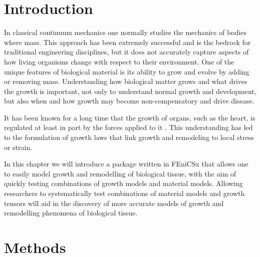 \section{Introduction}
In classical continuum mechanics one normally studies the mechanics of bodies where mass. This approach has been extremely successful and is the bedrock for traditional engineering disciplines, but it does not accurately capture aspects of how living organisms change with respect to their environment. One of the unique features of biological material is its ability to grow and evolve by adding or removing mass. Understanding how biological matter grows and what drives the growth is important, not only to understand normal growth and development, but also when and how growth may become non-compensatory and drive disease.\par It has been known for a long time that the growth of organs, such as the heart, is regulated at least in part by the forces applied to it \citep{Hsu1968}. This understanding has led to the formulation of growth laws that link growth and remodeling to local stress or strain. \par
In this chapter we will introduce a package written in FEniCSx that allows one to easily model growth and remodelling of biological tissue, with the aim of quickly testing combinations of growth models and material models. Allowing researchers to systematically test combinations of material models and growth tensors will aid in the discovery of more accurate models of growth and remodelling phenomena of biological tissue.
\section{Methods}
